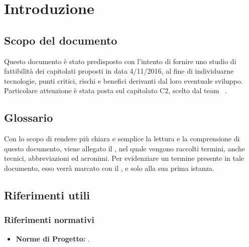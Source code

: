 \documentclass[../StudioDiFattibilita.tex]{subfiles}
\begin{document}
\section{Introduzione}
	\subsection{Scopo del documento}
    Questo documento è stato predisposto con l'intento di fornire uno studio di fattibilità dei capitolati proposti in data 4/11/2016, al fine di individuarne tecnologie, punti critici, rischi e benefici derivanti dal loro eventuale sviluppo. Particolare attenzione è stata posta sul capitolato C2, scelto dal team \kpanic\ . 

	\subsection{Glossario}
	Con lo scopo di rendere più chiara e semplice la lettura e la comprensione di questo documento, viene allegato il \glossariov, nel quale vengono raccolti termini, anche tecnici, abbreviazioni ed acronimi. Per evidenziare un termine presente in tale documento, esso verrà marcato con il , e solo alla sua prima istanza.
    
    \subsection{Riferimenti utili}
        \subsubsection{Riferimenti normativi}
        \begin{itemize}
            \item \textbf{Norme di Progetto:} \normediprogettov.
        \end{itemize}
\end{document}
